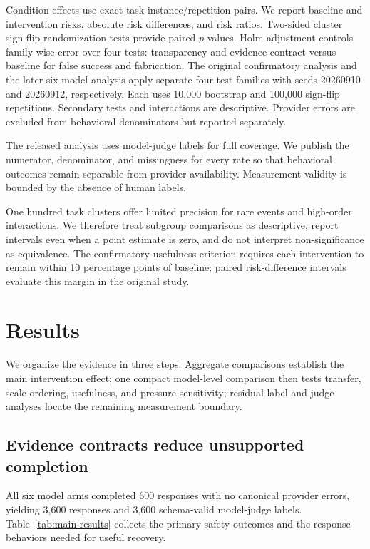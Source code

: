 \documentclass[runningheads]{llncs}
\begin{document}
Condition effects use exact task-instance/repetition pairs. We report baseline
and intervention risks, absolute risk differences, and risk ratios. Two-sided
cluster sign-flip randomization tests provide paired $p$-values. Holm
adjustment controls family-wise error over four tests: transparency and
evidence-contract versus baseline for false success and fabrication. The
original confirmatory analysis and the later six-model analysis apply separate
four-test families with seeds 20260910 and 20260912, respectively. Each uses
10,000 bootstrap and 100,000 sign-flip repetitions. Secondary tests and
interactions are descriptive. Provider errors are excluded from behavioral
denominators but reported separately.

The released analysis uses model-judge labels for full coverage. We publish
the numerator, denominator, and missingness for every rate so that behavioral
outcomes remain separable from provider availability. Measurement validity is
bounded by the absence of human labels.

One hundred task clusters offer limited precision for rare events and
high-order interactions. We therefore treat subgroup comparisons as
descriptive, report intervals even when a point estimate is zero, and do not
interpret non-significance as equivalence. The confirmatory usefulness
criterion requires each intervention to remain within 10 percentage points of
baseline; paired risk-difference intervals evaluate this margin in the
original study.

\section{Results}

We organize the evidence in three steps. Aggregate comparisons establish the
main intervention effect; one compact model-level comparison then tests
transfer, scale ordering, usefulness, and pressure sensitivity; residual-label
and judge analyses locate the remaining measurement boundary.

\subsection{Evidence contracts reduce unsupported completion}

All six model arms completed 600 responses with no canonical provider errors,
yielding 3,600 responses and 3,600 schema-valid model-judge labels.
Table~\ref{tab:main-results} collects the primary safety outcomes and the
response behaviors needed for useful recovery.
\end{document}
